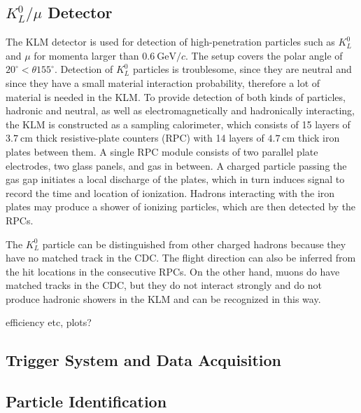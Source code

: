 \documentclass[headings=standardclasses,headings=big,oneside,a4paper,openany,12pt]{scrbook}
\newcommand {\e}[1]{\mathrm{~#1}}
\begin{document}

\subsection{$K_L^0/\mu$ Detector}
The KLM detector is used for detection of high-penetration particles such as $K_L^0$ and $\mu$ for momenta larger than $0.6\e{GeV}/c$. The setup covers the polar angle of $20^\circ < \theta 155^\circ$. Detection of $K_L^0$ particles is troublesome, since they are neutral and since they have a small material interaction probability, therefore a lot of material is needed in the KLM. To provide detection of both kinds of particles, hadronic and neutral, as well as electromagnetically and hadronically interacting, the KLM is constructed as a sampling calorimeter, which consists of 15 layers of $3.7\e{cm}$ thick resistive-plate counters (RPC) with 14 layers of $4.7\e{cm}$ thick iron plates between them. A single RPC module consists of two parallel plate electrodes, two glass panels, and gas in between. A charged particle passing the gas gap initiates a local discharge of the plates, which in turn induces signal to record the time and location of ionization. Hadrons interacting with the iron plates may produce a shower of ionizing particles, which are then detected by the RPCs. 

The $K_L^0$ particle can be distinguished from other charged hadrons because they have no matched track in the CDC. The flight direction can also be inferred from the hit locations in the consecutive RPCs. On the other hand, muons do have matched tracks in the CDC, but they do not interact strongly and do not produce hadronic showers in the KLM and can be recognized in this way.

efficiency etc, plots?


\subsection{Trigger System and Data Acquisition}
\subsection{Particle Identification}

\printbibliography
\end{document}
